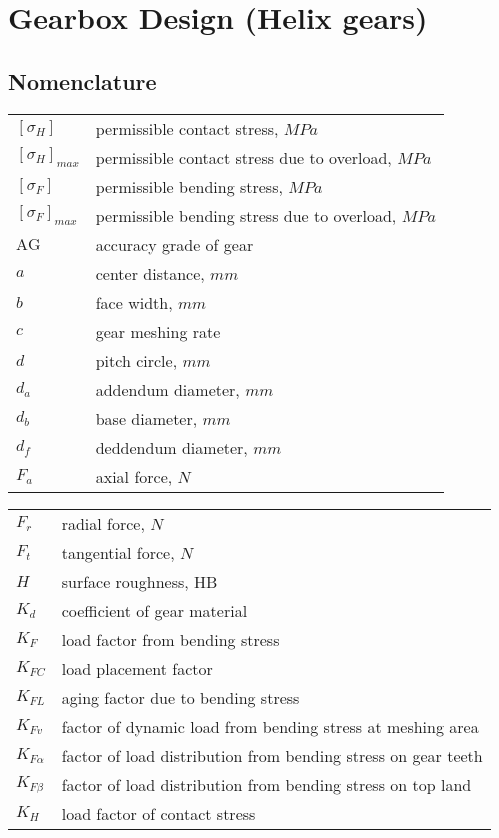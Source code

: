 \chapter{Gearbox Design (Helix gears)}
\section{Nomenclature}
\begin{tabular}[t]{lp{6.5cm}}
	$ [\sigma_H] $ & permissible contact stress, $ \unit{MPa} $\\
	$ [\sigma_H]_{max} $ & permissible contact stress due to overload, $ \unit{MPa} $\\
	$ [\sigma_F] $ & permissible bending stress, $ \unit{MPa} $\\
	$ [\sigma_F]_{max} $ & permissible bending stress due to overload, $ \unit{MPa} $\\
	$ \text{AG} $ & accuracy grade of gear\\
	$ a $ & center distance, $ \unit{mm} $\\
	$ b $ & face width, $ \unit{mm} $\\
	$ c $ & gear meshing rate\\
	$ d $ & pitch circle, $ \unit{mm} $\\
	$ d_a $ & addendum diameter, $ \unit{mm} $\\
	$ d_b $ & base diameter, $ \unit{mm} $\\
	$ d_f $ & deddendum diameter, $ \unit{mm} $\\
	$ F_a $ & axial force, $ \unit{N} $\\
\end{tabular}
\begin{tabular}[t]{lp{6.5cm}}
	$ F_r $ & radial force, $ \unit{N} $\\
	$ F_t $ & tangential force, $ \unit{N} $\\
	$ H $ & surface roughness, HB\\
	$ K_d $ & coefficient of gear material\\	
	$ K_F $ & load factor from bending stress\\
	$ K_{FC} $ & load placement factor\\
	$ K_{FL} $ & aging factor due to bending stress\\
	$ K_{Fv} $ & factor of dynamic load from bending stress at meshing area\\
	$ K_{F\alpha} $ & factor of load distribution from bending stress on gear teeth\\
	$ K_{F\beta} $ & factor of load distribution from bending stress on top land\\
	$ K_H $ & load factor of contact stress\\
\end{tabular}\newpage
